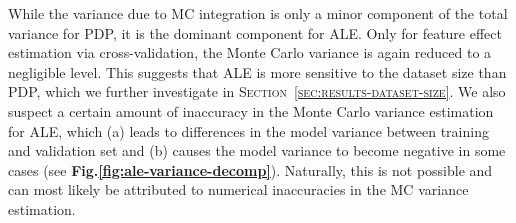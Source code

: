 \documentclass[runningheads]{llncs}
\begin{document}
While the variance due to MC integration is only a minor component of the total
variance for PDP, it is the dominant component for ALE. Only for feature effect  %
estimation via cross-validation, the Monte Carlo variance is again reduced to a
negligible level. This suggests that ALE is more sensitive to the dataset size
than PDP, which we further investigate in
\textsc{Section~\ref{sec:results-dataset-size}}. We also suspect a certain
amount of inaccuracy in the Monte Carlo variance estimation for ALE, which (a)
leads to differences in the model variance between training and validation set
and (b) causes the model variance to become negative in some cases (see
\textbf{Fig.\@\ref{fig:ale-variance-decomp}}). Naturally, this is not possible
and can most likely be attributed to numerical inaccuracies in the MC variance
estimation.
\end{document}

